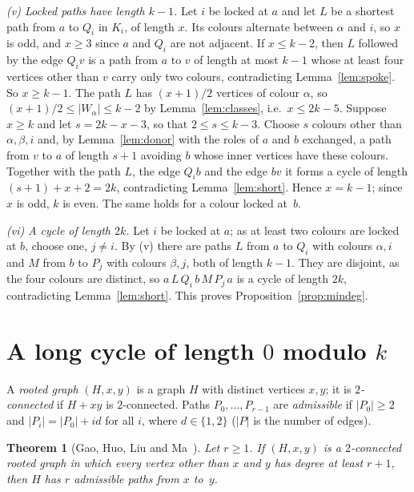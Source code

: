 \documentclass[11pt]{article}
\newtheorem{theorem}{Theorem}
\theoremstyle{remark}
\begin{document}
\emph{(v) Locked paths have length $k-1$.} Let $i$ be locked at $a$ and let
$L$ be a shortest path from $a$ to $Q_i$ in $K_i$, of length $x$. Its colours
alternate between $\alpha$ and $i$, so $x$ is odd, and $x\ge3$ since $a$ and
$Q_i$ are not adjacent. If $x\le k-2$, then $L$ followed by the edge $Q_iv$ is a
path from $a$ to $v$ of length at most $k-1$ whose at least four vertices other
than $v$ carry only two colours, contradicting Lemma~\ref{lem:spoke}. So
$x\ge k-1$. The path $L$ has $(x+1)/2$ vertices of colour $\alpha$, so
$(x+1)/2\le|W_\alpha|\le k-2$ by Lemma~\ref{lem:classes}, i.e.\ $x\le2k-5$.
Suppose $x\ge k$ and let $s=2k-x-3$, so that $2\le s\le k-3$. Choose $s$ colours
other than $\alpha,\beta,i$ and, by Lemma~\ref{lem:donor} with the roles of $a$
and $b$ exchanged, a path from $v$ to $a$ of length $s+1$ avoiding $b$ whose
inner vertices have these colours. Together with the path $L$, the edge $Q_ib$
and the edge $bv$ it forms a cycle of length $(s+1)+x+2=2k$, contradicting
Lemma~\ref{lem:short}. Hence $x=k-1$; since $x$ is odd, $k$ is even. The same
holds for a colour locked at~$b$.

\emph{(vi) A cycle of length $2k$.} Let $i$ be locked at $a$; as at least two
colours are locked at $b$, choose one, $j\ne i$. By (v) there are paths $L$ from
$a$ to $Q_i$ with colours $\alpha,i$ and $M$ from $b$ to $P_j$ with colours
$\beta,j$, both of length $k-1$. They are disjoint, as the four colours are
distinct, so $a\,L\,Q_i\,b\,M\,P_j\,a$ is a cycle of length $2k$, contradicting
Lemma~\ref{lem:short}. This proves Proposition~\ref{prop:mindeg}.

\section{A long cycle of length $0$ modulo $k$}\label{sec:long}

A \emph{rooted graph} $(H,x,y)$ is a graph $H$ with distinct vertices $x,y$; it
is \emph{$2$-connected} if $H+xy$ is $2$-connected. Paths $P_0,\dots,P_{r-1}$
are \emph{admissible} if $|P_0|\ge2$ and $|P_i|=|P_0|+id$ for all $i$, where
$d\in\{1,2\}$ ($|P|$ is the number of edges).

\begin{theorem}[{Gao, Huo, Liu and Ma~\cite[Theorem~3.1]{ghlm}}]\label{thm:ghlm}
Let $r\ge1$. If $(H,x,y)$ is a $2$-connected rooted graph in which every vertex
other than $x$ and $y$ has degree at least $r+1$, then $H$ has $r$ admissible
paths from $x$ to~$y$.
\end{theorem}
\end{document}
